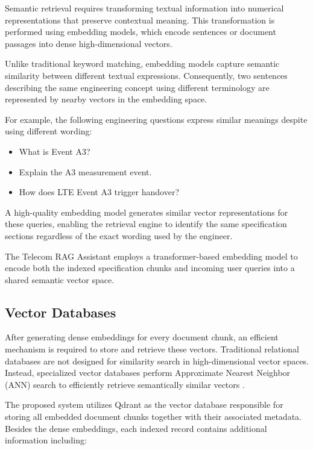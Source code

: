 Semantic retrieval requires transforming textual information into numerical representations that preserve contextual meaning. This transformation is performed using embedding models, which encode sentences or document passages into dense high-dimensional vectors.

Unlike traditional keyword matching, embedding models capture semantic similarity between different textual expressions. Consequently, two sentences describing the same engineering concept using different terminology are represented by nearby vectors in the embedding space.

For example, the following engineering questions express similar meanings despite using different wording:

\begin{itemize}
    \item What is Event A3?
    \item Explain the A3 measurement event.
    \item How does LTE Event A3 trigger handover?
\end{itemize}

A high-quality embedding model generates similar vector representations for these queries, enabling the retrieval engine to identify the same specification sections regardless of the exact wording used by the engineer.

The Telecom RAG Assistant employs a transformer-based embedding model to encode both the indexed specification chunks and incoming user queries into a shared semantic vector space.

\subsection{Vector Databases}

After generating dense embeddings for every document chunk, an efficient mechanism is required to store and retrieve these vectors. Traditional relational databases are not designed for similarity search in high-dimensional vector spaces. Instead, specialized vector databases perform Approximate Nearest Neighbor (ANN) search to efficiently retrieve semantically similar vectors \cite{manning2008}.

The proposed system utilizes Qdrant as the vector database responsible for storing all embedded document chunks together with their associated metadata. Besides the dense embeddings, each indexed record contains additional information including:

